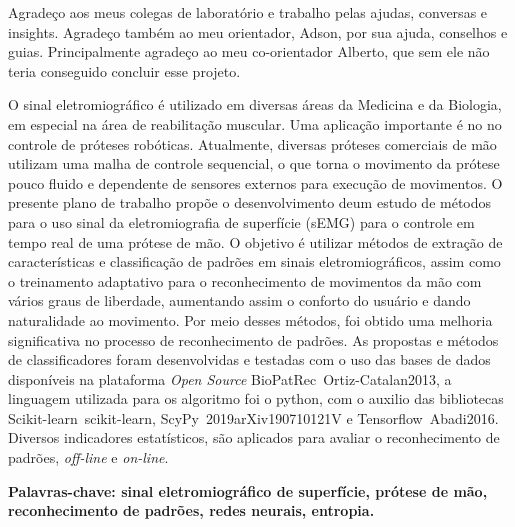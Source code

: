 \documentclass[a4paper, 12pt]{ppgeb}
\begin{document}
\vspace{24pt} Agradeço aos meus colegas de laboratório e trabalho pelas ajudas, conversas e insights. Agradeço também ao meu orientador, Adson, por sua ajuda, conselhos e guias. Principalmente agradeço ao meu co-orientador Alberto, que sem ele não teria conseguido concluir esse projeto.

\noindent 
\clearpage


\acresetall %
\vspace{12pt}

O sinal eletromiográfico é utilizado em diversas áreas da Medicina e da Biologia, em especial na área de reabilitação muscular. Uma aplicação importante é no no controle de próteses robóticas. Atualmente, diversas próteses comerciais de mão utilizam uma malha de controle sequencial, o que torna o movimento da prótese pouco fluido e dependente de sensores externos para execução de movimentos. O presente plano de trabalho propõe o desenvolvimento deum estudo de métodos para o uso sinal da eletromiografia de superfície (sEMG) para o controle em tempo real de uma prótese de mão. O objetivo é utilizar métodos de extração de características e classificação de padrões em sinais eletromiográficos, assim como o treinamento adaptativo para o reconhecimento de movimentos da mão com vários graus de liberdade, aumentando assim o conforto do usuário e dando naturalidade ao movimento. Por meio desses métodos, foi obtido uma melhoria significativa no processo de reconhecimento de padrões. As propostas e métodos de classificadores foram desenvolvidas e testadas com o uso das bases de dados disponíveis na plataforma \textit{Open Source} BioPatRec~\cite{resumoestendido}{Ortiz-Catalan2013}, a linguagem utilizada para os algoritmo foi o python, com o auxilio das bibliotecas Scikit-learn~\cite{resumoestendido}{scikit-learn}, ScyPy~\cite{resumoestendido}{2019arXiv190710121V} e Tensorflow~\cite{resumoestendido}{Abadi2016}. Diversos indicadores estatísticos, são aplicados para avaliar o reconhecimento de padrões, \textit{off-line} e \textit{on-line}.

\vspace{14pt}

\noindent\textbf{Palavras-chave: sinal eletromiográfico de superfície, prótese de mão, reconhecimento de padrões, redes neurais, entropia.}
\end{document}
